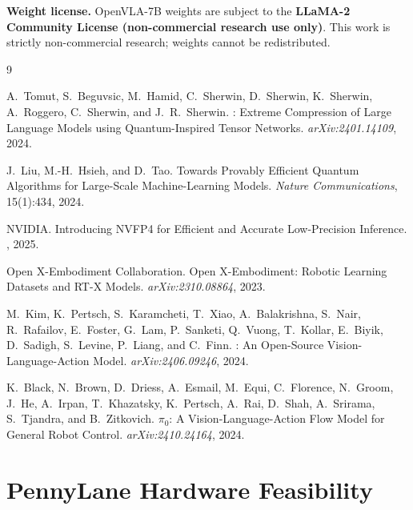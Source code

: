 \documentclass[10pt,twocolumn]{article}
\begin{document}
\textbf{Weight license.} OpenVLA-7B weights are subject to the
\textbf{LLaMA-2 Community License (non-commercial research use only)}.
This work is strictly non-commercial research; weights cannot be redistributed.


\begin{thebibliography}{9}

A.~Tomut, S.~Beguvsic, M.~Hamid, C.~Sherwin, D.~Sherwin, K.~Sherwin, A.~Roggero,
C.~Sherwin, and J.~R.~Sherwin.
: Extreme Compression of Large Language Models using
  Quantum-Inspired Tensor Networks.
\newblock \emph{arXiv:2401.14109}, 2024.

J.~Liu, M.-H.~Hsieh, and D.~Tao.
\newblock Towards Provably Efficient Quantum Algorithms for Large-Scale
  Machine-Learning Models.
\newblock \emph{Nature Communications}, 15(1):434, 2024.

{NVIDIA}.
\newblock Introducing NVFP4 for Efficient and Accurate Low-Precision Inference.
, 2025.

{Open X-Embodiment Collaboration}.
\newblock Open X-Embodiment: Robotic Learning Datasets and RT-X Models.
\newblock \emph{arXiv:2310.08864}, 2023.

M.~Kim, K.~Pertsch, S.~Karamcheti, T.~Xiao, A.~Balakrishna, S.~Nair,
  R.~Rafailov, E.~Foster, G.~Lam, P.~Sanketi, Q.~Vuong, T.~Kollar,
  E.~Biyik, D.~Sadigh, S.~Levine, P.~Liang, and C.~Finn.
: An Open-Source Vision-Language-Action Model.
\newblock \emph{arXiv:2406.09246}, 2024.

K.~Black, N.~Brown, D.~Driess, A.~Esmail, M.~Equi, C.~Florence, N.~Groom,
  J.~He, A.~Irpan, T.~Khazatsky, K.~Pertsch, A.~Rai, D.~Shah, A.~Srirama,
  S.~Tjandra, and B.~Zitkovich.
\newblock $\pi_0$: A Vision-Language-Action Flow Model for General Robot Control.
\newblock \emph{arXiv:2410.24164}, 2024.

\end{thebibliography}

\appendix

\section{PennyLane Hardware Feasibility}
\label{app:pennylane}
\end{document}

